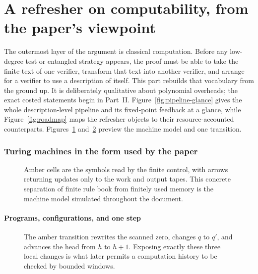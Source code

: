 
\clearpage
\part{A refresher on computability, from the paper's viewpoint}
\label{part:refresher}
\setlength{\parskip}{0.30em}

The outermost layer of the argument is classical computation.  Before any
low-degree test or entangled strategy appears, the proof must be able to take
the finite text of one verifier, transform that text into another verifier,
and arrange for a verifier to use a description of itself.  This part rebuilds
that vocabulary from the ground up.  It is deliberately qualitative about
polynomial overheads; the exact costed statements begin in Part~II.
Figure~\ref{fig:pipeline-glance} gives the whole description-level pipeline
and its fixed-point feedback at a glance, while Figure~\ref{fig:roadmap} maps
the refresher objects to their resource-accounted counterparts.
Figures~\ref{fig:tm-anatomy} and~\ref{fig:one-step} preview the machine model
and one transition.

\section{Turing machines in the form used by the paper}
\label{sec:refresher-tm}

\begin{figure}[h]
\centering

\caption{Amber cells are the symbols read by the finite control, with arrows returning updates only to the work and output tapes.  This concrete separation of finite rule book from finitely used memory is the machine model simulated throughout the document.}
\label{fig:tm-anatomy}
\end{figure}


\subsection{Programs, configurations, and one step}

\begin{figure}[t]
\centering

\caption{The amber transition rewrites the scanned zero, changes \(q\) to \(q'\), and advances the head from \(h\) to \(h+1\).  Exposing exactly these three local changes is what later permits a computation history to be checked by bounded windows.}
\label{fig:one-step}
\end{figure}


